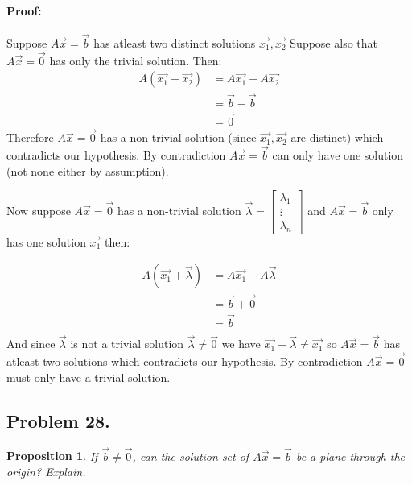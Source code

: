 \documentclass[12pt, letterpaper]{article}
\theoremstyle{statement}
\newtheorem*{atmProp}{Proposition}
\newenvironment{atmProof}{\noindent\ignorespaces\paragraph{Proof:}}{\hfill \ding{122}\par\noindent}
\begin{document}
            \begin{atmProof}
                Suppose $A\Vec{x}=\Vec{b}$ has atleast two distinct solutions $\Vec{x_1}, \Vec{x_2}$
                Suppose also that $A\Vec{x}=\Vec{0}$ has only the trivial solution. Then: 
                \begin{align*}
                    A(\Vec{x_1} - \Vec{x_2}) & = A\Vec{x_1} - A\Vec{x_2} \\
                    & = \Vec{b} - \Vec{b} \\
                    & = \Vec{0}
                \end{align*}
                Therefore $A\Vec{x} = \Vec{0}$ has a non-trivial solution (since $\vec{x_1}, \vec{x_2}$ are distinct) which contradicts our hypothesis. By contradiction $A\Vec{x} = \Vec{b}$ can only have one solution (not none either by assumption).
                
                Now suppose $A\Vec{x} = \Vec{0}$ has a non-trivial solution $\Vec{\lambda} = \begin{bmatrix} \lambda_1 \\ \vdots \\ \lambda_n \end{bmatrix}$ and $A\Vec{x} = \Vec{b}$ only has one solution $\Vec{x_1}$ then:
                
                \begin{align*}
                    A(\Vec{x_1} + \Vec{\lambda}) & = A\Vec{x_1} + A\Vec{\lambda} \\
                    & = \Vec{b} + \Vec{0} \\
                    & = \Vec{b} \\
                \end{align*}
                And since $\vec{\lambda}$ is not a trivial solution $\vec{\lambda} \neq \Vec{0}$ we have $\Vec{x_1} + \Vec{\lambda} \neq \Vec{x_1}$ so $A\Vec{x} = \Vec{b}$ has atleast two solutions which contradicts our hypothesis. By contradiction $A\Vec{x} = \Vec{0}$ must only have a trivial solution.
            \end{atmProof}
        
        \subsection*{Problem 28.}
            \begin{atmProp}
                If $\vec{b} \neq \vec{0}$, can the solution set of $A\vec{x}=\vec{b}$ be a plane through the origin? Explain.
            \end{atmProp}
            
\end{document}
